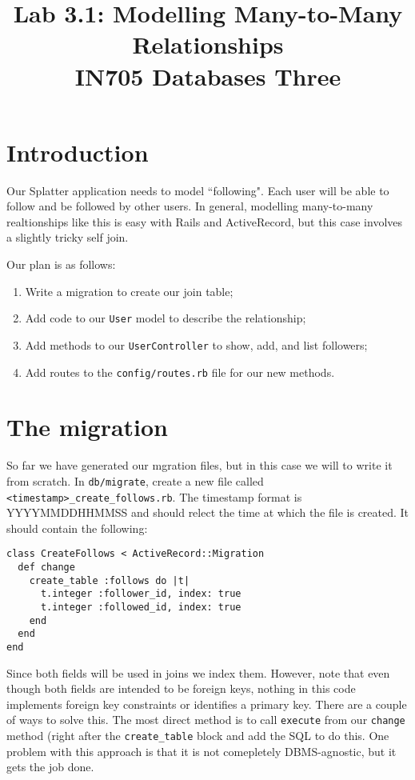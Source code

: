 \documentclass{article}
\begin{document}
\title{Lab 3.1: Modelling Many-to-Many Relationships \\ IN705 Databases Three}
\date{}
\maketitle

\section*{Introduction}
Our Splatter application needs to model ``following".  Each user will be able to follow and be followed by other users.  In general, modelling many-to-many realtionships like this is easy with Rails and ActiveRecord, but this case involves a slightly tricky self join.

Our plan is as follows:
\begin{enumerate}
  \item Write a migration to create our join table;
  \item Add code to our \texttt{User} model to describe the relationship;
  \item Add methods to our \texttt{UserController} to show, add, and list followers;
  \item Add routes to the \texttt{config/routes.rb} file for our new methods.
\end{enumerate}

\section{The migration}
So far we have generated our mgration files, but in this case we will to write it from scratch.  In \texttt{db/migrate}, create a new file called \texttt{<timestamp>\_create\_follows.rb}. The timestamp format is YYYYMMDDHHMMSS and should relect the time at which the file is created. It should contain the following:

\begin{verbatim}
class CreateFollows < ActiveRecord::Migration
  def change
    create_table :follows do |t|
      t.integer :follower_id, index: true
      t.integer :followed_id, index: true
    end
  end
end
\end{verbatim}

Since both fields will be used in joins we index them.  However, note that even though both fields are intended to be foreign keys, nothing in this code implements foreign key constraints or identifies a primary key. There are a couple of ways to solve this.  The most direct method is to call \texttt{execute} from our \texttt{change} method (right after the \texttt{create\_table} block and add the SQL to do this.  One problem with this approach is that it is not comepletely DBMS-agnostic, but it gets the job done.
\end{document}
